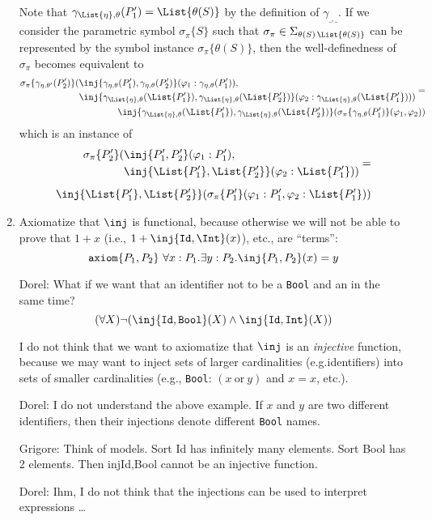\documentclass{article}
\newcommand\comment[2]{\par\noindent\color{red}#1: #2\color{black}\par\noindent}
\newcommand\dl{\comment{Dorel}}
\newcommand\gr{\comment{Grigore}}
\theoremstyle{definition}
\theoremstyle{definition}
\theoremstyle{definition}
\theoremstyle{definition}
\theoremstyle{definition}
\theoremstyle{theorem}
\theoremstyle{theorem}
\theoremstyle{theorem}
\theoremstyle{theorem}
\theoremstyle{theorem}
\newcommand{\axiom}{\texttt{axiom}}
\begin{document}
\begin{enumerate}[label=(\arabic*)]
{\[\begin{split}
\end{split}
\]
Note that $\gamma_{\List{\eta},\theta}(P'_1) = \List{\theta(S)}$ by the definition of $\gamma_{\_,\_}$.
If we consider the parametric symbol $\sigma_\pi\{S\}$ such that $\sigma_\pi\in\Sigma_{\theta(S)\,\List{\theta(S)}}$ can be represented by the symbol instance $\sigma_\pi\{\theta(S)\}$, then the well-definedness of $\sigma_\pi$ becomes equivalent to
\[
\begin{split}
\begin{aligned}
\sigma_\pi\{\gamma_{\eta,\theta'}(P'_2)\}(&\inj\{\gamma_{\eta,\theta}(P'_1),\gamma_{\eta,\theta}(P'_2)\}(\varphi_1:\gamma_{\eta,\theta}(P'_1)), \\
&\inj\{\gamma_{\List{\eta},\theta}(\List{P'_1}),\gamma_{\List{\eta},\theta}(\List{P'_2})\}(\varphi_2:\gamma_{\List{\eta},\theta}(\List{P'_1})))
\end{aligned}=\\
\inj\{\gamma_{\List{\eta},\theta}(\List{P'_1}),\gamma_{\List{\eta},\theta}(\List{P'_2})\}(\sigma_\pi\{\gamma_{\eta,\theta}(P'_1)\}(\varphi_1,\varphi_2))
\end{split}
\]
which is an instance of 
\[
\begin{split}
\begin{aligned}
\sigma_\pi\{P'_2\}(&\inj\{P'_1,P'_2\}(\varphi_1:P'_1), \\
&\inj\{\List{P'_1},\List{P'_2}\}(\varphi_2:\List{P'_1}))
\end{aligned}=\\[1ex]
\inj\{\List{P'_1},\List{P'_2}\}(\sigma_\pi\{P'_1\}(\varphi_1:P'_1,\varphi_2:\List{P'_1}))
\end{split}
\]
}

\item\label{axiom-functional}
Axiomatize that \(\inj\) is functional, because otherwise we will not
be able to prove that \(1+x\) (i.e., \(1 + \inj\{\texttt{Id}, \Int\}(x)\)), etc., are ``terms'':
\[\axiom\{P_1,P_2\}\ \forall x:P_1.\exists y:P_2.\inj\{P_1,P_2\}(x)=y\]
\dl{What if we want that an identifier not to be a \texttt{Bool} and an \Int{} in the same time?\\
\[(\forall X)\neg (\inj\{\texttt{Id},\texttt{Bool}\}(X)
  \land \inj\{\texttt{Id},\texttt{Int}\}(X))\]}
I do not think that we want to axiomatize that \(\inj\) is an
\emph{injective} function, because we may want to inject sets of larger
cardinalities (e.g.identifiers) into sets of smaller cardinalities
(e.g., \texttt{Bool}: \((x\ \text{or}\ y)\) and \(x=x\), etc.).
\dl{I do not understand the above example. If $x$ and $y$ are two different identifiers, then their injections denote different \texttt{Bool} names.}
\gr{Think of models.  Sort Id has infinitely many elements.  Sort Bool has 2 elements.  Then inj{Id,Bool} cannot be an injective function.}
\dl{Ihm, I do not think that the injections can be used to interpret expressions \ldots }


\end{enumerate}
\end{document}
